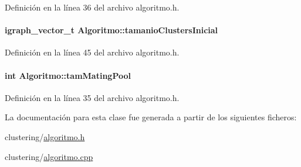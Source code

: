 Definición en la línea 36 del archivo algoritmo.\-h.

\hypertarget{class_algoritmo_aa4b30738a2e2676d8375ad8a465067a7}{
\paragraph[{tamanio\-Clusters\-Inicial}]{\setlength{\rightskip}{0pt plus 5cm}igraph\-\_\-vector\-\_\-t Algoritmo\-::tamanio\-Clusters\-Inicial\hspace{0.3cm}{\ttfamily [private]}}}\label{class_algoritmo_aa4b30738a2e2676d8375ad8a465067a7}


Definición en la línea 45 del archivo algoritmo.\-h.

\hypertarget{class_algoritmo_a0c34d9a4f7a55fc4afa538dd477ac633}{
\paragraph[{tam\-Mating\-Pool}]{\setlength{\rightskip}{0pt plus 5cm}int Algoritmo\-::tam\-Mating\-Pool\hspace{0.3cm}{\ttfamily [private]}}}\label{class_algoritmo_a0c34d9a4f7a55fc4afa538dd477ac633}


Definición en la línea 35 del archivo algoritmo.\-h.



La documentación para esta clase fue generada a partir de los siguientes ficheros\-:\begin{DoxyCompactItemize}
\item 
clustering/\hyperlink{algoritmo_8h}{algoritmo.\-h}\item 
clustering/\hyperlink{algoritmo_8cpp}{algoritmo.\-cpp}\end{DoxyCompactItemize}
